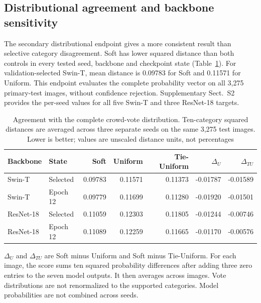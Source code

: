 \subsection{Distributional agreement and backbone sensitivity}\label{sec:distance}

The secondary distributional endpoint gives a more consistent result than selective category disagreement. Soft has lower squared distance than both controls in every tested seed, backbone and checkpoint state (Table~\ref{tab:distance}). For validation-selected Swin-T, mean distance is 0.09783 for Soft and 0.11571 for Uniform. This endpoint evaluates the complete probability vector on all 3,275 primary-test images, without confidence rejection. Supplementary Sect.~S2 provides the per-seed values for all five Swin-T and three ResNet-18 targets.

\begin{table}[t]\caption{Agreement with the complete crowd-vote distribution. Ten-category squared distances are averaged across three separate seeds on the same 3,275 test images. Lower is better; values are unscaled distance units, not percentages}\label{tab:distance}

\centering\small\begin{tabular}{llrrrrr}\toprule

Backbone & State & Soft & Uniform & Tie-Uniform & $\Delta_U$ & $\Delta_{TU}$\\\midrule

Swin-T & Selected & 0.09783 & 0.11571 & 0.11373 & -0.01787 & -0.01589\\

Swin-T & Epoch 12 & 0.09779 & 0.11699 & 0.11280 & -0.01920 & -0.01501\\

ResNet-18 & Selected & 0.11059 & 0.12303 & 0.11805 & -0.01244 & -0.00746\\

ResNet-18 & Epoch 12 & 0.11089 & 0.12259 & 0.11665 & -0.01170 & -0.00576\\

\bottomrule\end{tabular}\par\smallskip

$\Delta_U$ and $\Delta_{TU}$ are Soft minus Uniform and Soft minus Tie-Uniform. For each image, the score sums ten squared probability differences after adding three zero entries to the seven model outputs. It then averages across images. Vote distributions are not renormalized to the supported categories. Model probabilities are not combined across seeds.\par\end{table}

